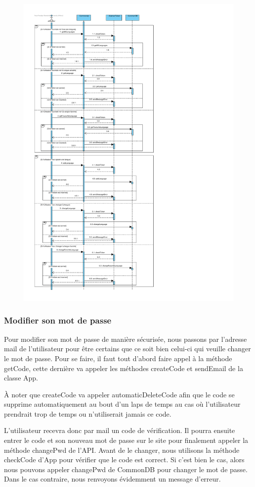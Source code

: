 \begin{figure}[h]
\centering
\includegraphics[height = 1\textwidth]{Base/sequence/img/common/gerer_les_langues.pdf}
\end{figure}

\newpage
\subsubsection{Modifier son mot de passe}

\begin{flushleft}
Pour modifier son mot de passe de manière sécurisée, nous passons par l'adresse mail de l'utilisateur pour être certains que ce soit bien celui-ci qui veuille changer le mot de passe. Pour se faire, il faut tout d'abord faire appel à la méthode getCode, cette dernière va appeler les méthodes createCode et sendEmail de la classe App.
\end{flushleft}

\begin{flushleft}
À noter que createCode va appeler automaticDeleteCode afin que le code se supprime automatiquement au bout d'un laps de temps au cas où l'utilisateur prendrait trop de temps ou n'utiliserait jamais ce code.
\end{flushleft}

\begin{flushleft}
L'utilisateur recevra donc par mail un code de vérification. Il pourra ensuite entrer le code et son nouveau mot de passe sur le site pour finalement appeler la méthode changePwd de l'API. Avant de le changer, nous utilisons la méthode checkCode d'App pour vérifier que le code est correct. Si c'est bien le cas, alors nous pouvons appeler changePwd de CommonDB pour changer le mot de passe. Dans le cas contraire, nous renvoyons évidemment un message d'erreur.
\end{flushleft}

